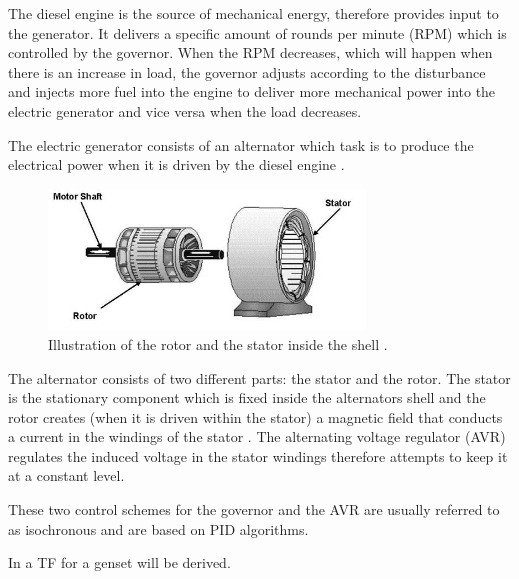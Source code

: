 The diesel engine is the source of mechanical energy, therefore provides input to the generator. It delivers a specific amount of rounds per minute (RPM) which is controlled by the governor. When the RPM decreases, which will happen when there is an increase in load, the governor adjusts according to the disturbance and injects more fuel into the engine to deliver more mechanical power into the electric generator and vice versa when the load decreases. 

The electric generator consists of an alternator which task is to produce the electrical power when it is driven by the diesel engine \cite{genset_how_it_works}.

\begin{figure}[H]
\centering
\includegraphics[width=0.75\textwidth]{rapport/billeder/statorrotor}
\caption{Illustration of the rotor and the stator inside the shell \cite{rotor_stator_pic}.}
\label{fig:statorrotor}
\end{figure}

The alternator consists of two different parts: the stator and the rotor. The stator is the stationary component which is fixed inside the alternators shell and the rotor creates (when it is driven within the stator) a magnetic field that conducts a current in the windings of the stator \cite{genset_how_it_works}. The alternating voltage regulator (AVR) regulates the induced voltage in the stator windings therefore attempts to keep it at a constant level. 

These two control schemes for the governor and the AVR are usually referred to as isochronous and are based on PID algorithms. 
 

In  a TF for a genset will be derived.  







